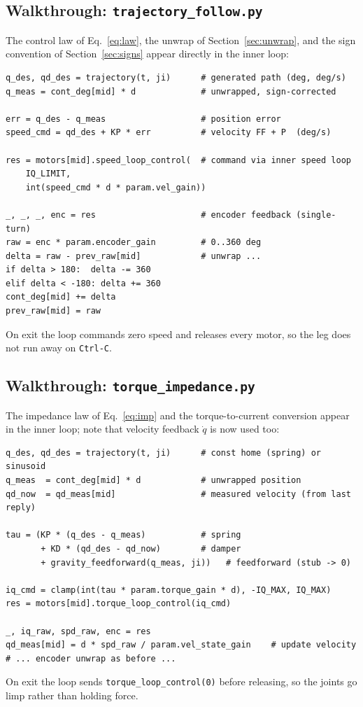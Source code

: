 \documentclass[11pt,a4paper]{article}
\newcommand{\code}[1]{\texttt{#1}}
\begin{document}
\subsection{Walkthrough: \texttt{trajectory\_follow.py}}
The control law of Eq.~\eqref{eq:law}, the unwrap of
Section~\ref{sec:unwrap}, and the sign convention of Section~\ref{sec:signs}
appear directly in the inner loop:
\begin{lstlisting}
q_des, qd_des = trajectory(t, ji)      # generated path (deg, deg/s)
q_meas = cont_deg[mid] * d             # unwrapped, sign-corrected

err = q_des - q_meas                   # position error
speed_cmd = qd_des + KP * err          # velocity FF + P  (deg/s)

res = motors[mid].speed_loop_control(  # command via inner speed loop
    IQ_LIMIT,
    int(speed_cmd * d * param.vel_gain))

_, _, _, enc = res                     # encoder feedback (single-turn)
raw = enc * param.encoder_gain         # 0..360 deg
delta = raw - prev_raw[mid]            # unwrap ...
if delta > 180:  delta -= 360
elif delta < -180: delta += 360
cont_deg[mid] += delta
prev_raw[mid] = raw
\end{lstlisting}
On exit the loop commands zero speed and releases every motor, so the leg does
not run away on \code{Ctrl-C}.

\subsection{Walkthrough: \texttt{torque\_impedance.py}}
The impedance law of Eq.~\eqref{eq:imp} and the torque-to-current conversion
appear in the inner loop; note that velocity feedback $\dot q$ is now used too:
\begin{lstlisting}
q_des, qd_des = trajectory(t, ji)      # const home (spring) or sinusoid
q_meas  = cont_deg[mid] * d            # unwrapped position
qd_now  = qd_meas[mid]                 # measured velocity (from last reply)

tau = (KP * (q_des - q_meas)           # spring
       + KD * (qd_des - qd_now)        # damper
       + gravity_feedforward(q_meas, ji))   # feedforward (stub -> 0)

iq_cmd = clamp(int(tau * param.torque_gain * d), -IQ_MAX, IQ_MAX)
res = motors[mid].torque_loop_control(iq_cmd)

_, iq_raw, spd_raw, enc = res
qd_meas[mid] = d * spd_raw / param.vel_state_gain    # update velocity
# ... encoder unwrap as before ...
\end{lstlisting}
On exit the loop sends \code{torque\_loop\_control(0)} before releasing, so the
joints go limp rather than holding force.
\end{document}
